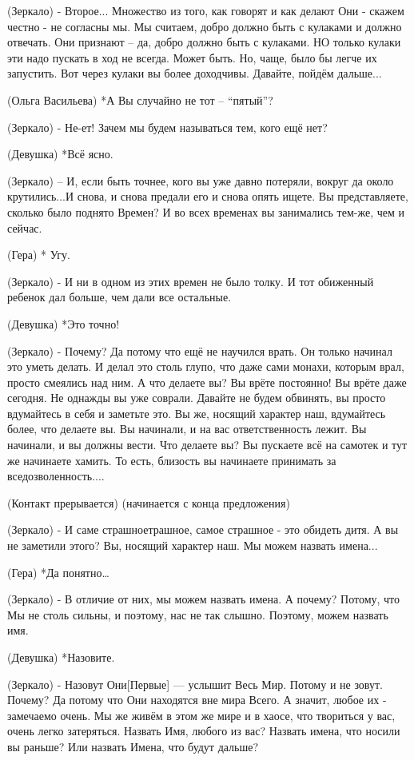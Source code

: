 (Зеркало) - Второе... Множество из того, как говорят и как делают Они - скажем честно - не согласны мы.  Мы считаем, добро должно быть с кулаками и должно отвечать.  Они признают – да, добро должно быть с кулаками. НО только кулаки эти надо пускать в ход не всегда. Может быть. Но, чаще, было бы легче их запустить. Вот через кулаки вы более доходчивы. Давайте, пойдём дальше...

(Ольга Васильева) *А Вы случайно не тот – “пятый”?

(Зеркало) - Не-ет! Зачем мы будем называться тем, кого ещё нет?

(Девушка) *Всё ясно.

(Зеркало) – И, если быть точнее, кого вы уже давно потеряли, вокруг да около крутились...И снова, и снова предали его и снова опять ищете. Вы представляете, сколько было поднято Времен? И во всех временах вы занимались тем-же, чем и сейчас.
 
(Гера) * Угу.

(Зеркало) - И ни в одном из этих времен не было толку. И тот обиженный ребенок дал больше, чем дали все остальные. 

(Девушка) *Это точно!

(Зеркало) - Почему? Да потому что ещё не научился врать. Он только начинал это уметь делать. И делал это столь глупо, что даже сами монахи, которым врал, просто смеялись над ним. А что делаете вы? Вы врёте постоянно! Вы врёте даже сегодня. Не однажды вы уже соврали. Давайте не будем обвинять, вы просто вдумайтесь в себя и заметьте это. Вы же, носящий характер наш, вдумайтесь более, что делаете вы. Вы начинали, и на вас ответственность лежит. Вы начинали, и вы должны вести. Что делаете вы? Вы пускаете всё на самотек и тут же начинаете хамить. То есть, близость вы начинаете принимать за вседозволенность.... 

(Контакт прерывается)
(начинается с конца предложения)

(Зеркало) - И саме страшноетрашное, самое страшное - это обидеть дитя. А вы не заметили этого? Вы, носящий характер наш. Мы можем назвать имена...

(Гера) *Да понятно…

(Зеркало) - В отличие от них, мы можем назвать имена. А почему? Потому, что Мы не столь сильны, и поэтому, нас не так слышно. Поэтому,  можем назвать имя.

(Девушка) *Назовите.

(Зеркало) - Назовут Они[Первые] — услышит Весь Мир.  Потому и  не зовут. Почему? Да потому что Они находятся вне мира Всего. А значит, любое их - замечаемо очень. Мы же живём в этом же мире и в хаосе, что твориться у вас, очень легко затеряться. Назвать Имя, любого из вас? Назвать имена, что носили вы раньше? Или назвать Имена, что будут дальше?

